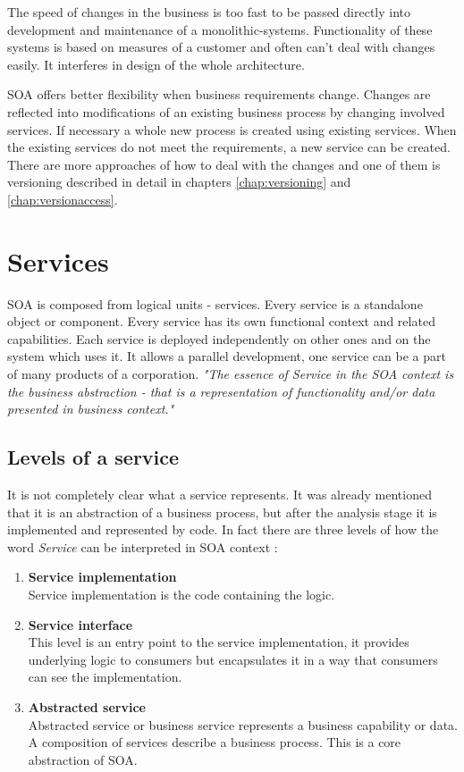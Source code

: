 The speed of changes in the business is too fast to be passed directly into development and maintenance of a \gls{monolithic-systems}. Functionality of these systems is based on measures of a customer and often can't deal with changes easily. It interferes in design of the whole architecture. 

SOA offers better flexibility when business requirements change. Changes are reflected into modifications of an existing business process by changing involved services. If necessary a whole new process is created using existing services. When the existing services do not meet the requirements, a new service can be created. There are more approaches of how to deal with the changes and one of them is versioning described in detail in chapters \ref{chap:versioning} and \ref{chap:versionaccess}.

\section{Services}
\label{sec:services}
SOA is composed from logical units - services. Every service is a standalone object or component. Every service has its own functional context and related capabilities. Each service is deployed independently on other ones and on the system which uses it. It allows a parallel development, one service can be a part of many products of a corporation.
\textit{"The essence of Service in the SOA context is the business abstraction - that is a representation of functionality and/or data presented in business context."} \cite{agile-architecture}

\subsection{Levels of a service} 
\label{subsec:levels-of-service}

It is not completely clear what a service represents. It was already mentioned that it is an abstraction of a business process, but after the analysis stage it is implemented and represented by code.
In fact there are three levels of how the word \emph{Service} can be interpreted in SOA context \cite{agile-architecture}:
\begin{enumerate}
  \item \textbf{Service implementation} \hfill \\
Service implementation is the code containing the logic.
  \item \textbf{Service interface} \hfill \\ 
This level is an entry point to the service implementation, it provides underlying logic to consumers but encapsulates it in a way that consumers can see the implementation. 
  \item \textbf{Abstracted service} \hfill \\
Abstracted service or business service represents a business capability or data. A composition of services describe a business process. This is a core abstraction of SOA.
\end{enumerate}

